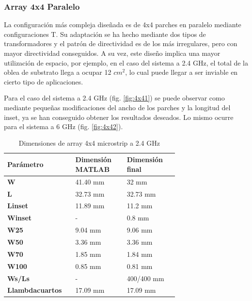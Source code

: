 \subsubsection{Array 4x4 Paralelo} 
\par La configuración más compleja diseñada es de 4x4 parches en paralelo mediante configuraciones T. Su adaptación se ha hecho mediante dos tipos de transformadores y el patrón de directividad es de los más irregulares, pero con mayor directividad conseguidos. A su vez, este diseño implica una mayor utilización de espacio, por ejemplo, en el caso del sistema a 2.4 GHz, el total de la oblea de substrato llega a ocupar 12 $cm^{2}$, lo cual puede llegar a ser inviable en cierto tipo de aplicaciones. 
\\
\par Para el caso del sistema a 2.4 GHz (fig. \ref{fig:4x41}) se puede observar como mediante pequeñas modificaciones del ancho de los parches y la longitud del inset, ya se han conseguido obtener los resultados deseados. Lo mismo ocurre para el sistema a 6 GHz (fig. \ref{fig:4x42}).
\\
\begin{table}[H]
  

   \small %
   \centering %
   \begin{tabular}{m{0.2\linewidth}m{0.25\linewidth}m{0.25\linewidth}} %
   \toprule[\heavyrulewidth]\toprule[\heavyrulewidth]
   \textbf{Parámetro} & \textbf{Dimensión MATLAB} & \textbf{Dimensión final} \\ 
   \midrule
   \textbf{W} & 41.40 mm & 32 mm \\
   \textbf{L} & 32.73 mm & 32.73 mm\\
   \textbf{Linset} & 11.89 mm & 11.2 mm\\
   \textbf{Winset} & - & 0.8 mm\\
   \textbf{W25} & 9.04 mm & 9.06 mm\\
   \textbf{W50} & 3.36 mm & 3.36 mm\\
   \textbf{W70} & 1.85 mm & 1.84 mm\\
   \textbf{W100} & 0.85 mm & 0.81 mm\\
   \textbf{Ws/Ls} & - & 400/400 mm\\
   \textbf{Llambdacuartos} & 17.09 mm & 17.09 mm\\
   \bottomrule[\heavyrulewidth] 
   \end{tabular}
   \caption{Dimensiones de array 4x4 microstrip a 2.4 GHz} 
      \label{tab:array4x41}
\end{table}


